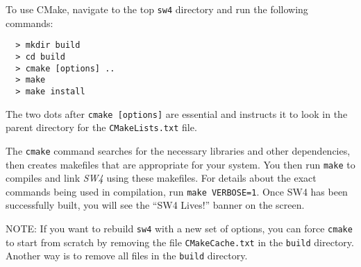 \documentclass[11pt]{article}
\begin{document}
To use CMake, navigate to the top {\tt sw4} directory and run the following commands:
\begin{verbatim}
  > mkdir build
  > cd build
  > cmake [options] ..
  > make
  > make install
\end{verbatim}

The two dots after {\tt cmake [options]} are essential and instructs it to look in the parent
directory for the {\tt CMakeLists.txt} file.
 
The \verb+cmake+ command searches for the necessary libraries and other dependencies, then creates
makefiles that are appropriate for your system. You then run \verb+make+ to compiles and link
\emph{SW4} using these makefiles. For details about the exact commands being used in compilation,
run \texttt{make VERBOSE=1}.  Once SW4 has been successfully built, you will see the
``SW4 Lives!'' banner on the screen.

NOTE: If you want to rebuild \verb+sw4+ with a new set of options, you can force \verb+cmake+ to start
from scratch by removing the file \verb+CMakeCache.txt+ in the \verb+build+ directory. Another way
is to remove all files in the \verb+build+ directory.
\end{document}
